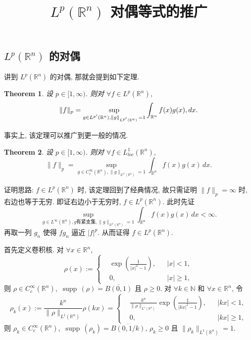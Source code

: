 \documentclass[a4paper,11pt]{article}
\title{$ L^p(\mathbb{R}^n) $ 对偶等式的推广}
\newtheorem{theorem}{Theorem}[section]
\theoremstyle{definition}
\def \supp {\mathop\mathrm{\,supp\,}}
\begin{document}
\begin{CJK*}{UTF8}{gbsn}

\maketitle

\section{$ L^p(\mathbb{R}^n) $ 的对偶}

讲到 $ L^p(\mathbb{R}^n) $ 的对偶, 那就会提到如下定理.

\begin{theorem}
    设 $ p \in [1, \infty) $. 则对 $ \forall f \in L^p(\mathbb{R}^n) $,
    $$
        \| f \|_p = \sup_{g \in L^{p'}(\mathbb{R}^n), \| g \|_{L^{p'}(\mathbb{R}^n)} \, = 1} 
            \int_{\mathbb{R}^n} f(x) g(x) \\, dx.
    $$
\end{theorem}

事实上, 该定理可以推广到更一般的情况.

\begin{theorem} \label{text}
    设 $ p \in [1, \infty) $. 则对 $ \forall f \in L^1_{loc}(\mathbb{R}^n) $,
    \begin{equation} \label{haha}
        \| f \|_p = \sup_{g \in C_c^\infty(\mathbb{R}^n), \| g \|_{L^{p'}(\mathbb{R}^n)} = 1} 
            \int_{\mathbb{R}^n} f(x) g(x) \, dx.
    \end{equation}
\end{theorem}

证明思路: $ f \in L^p(\mathbb{R}^n) $ 时, 该定理回到了经典情况, 
故只需证明 $ \| f \|_p = \infty $ 时, 右边也等于无穷. 
即证右边小于无穷时, $ f \in L^p(\mathbb{R}^n) $.
此时先证
$$
    \sup_{g \in L^\infty(\mathbb{R}^n), g \text{有紧支集}, \| g \|_{L^{p'}(\mathbb{R}^n)} = 1} 
        \int_{\mathbb{R}^n} f(x) g(x) \, dx < \infty.
$$
再取一列 $ g_n $ 使得 $ fg_n $ 逼近 $ |f|^p $. 从而证得 $ f \in L^p(\mathbb{R}^n) $.

首先定义卷积核. 对 $ \forall x \in \mathbb{R}^n $,
$$
    \rho(x) := \left\{ \begin{aligned}
        &\exp\left( \frac{1}{|x|^2 - 1} \right), && |x| < 1, \\
        &0,                             && |x| \geq 1,
    \end{aligned}\right.
$$
则 $ \rho \in C_c^\infty(\mathbb{R}^n) $, $ \supp(\rho) = \overline{B(0, 1)} $ 且 $ \rho \geq 0 $. 
对 $ \forall k \in \mathbb{N} $ 和 $ \forall x \in \mathbb{R}^n $, 令
$$
    \rho_k(x) := \frac{k^n}{\| \rho \|_{L^1(\mathbb{R}^n)}} \rho(kx)
        = \left\{ \begin{aligned}
        &\frac{k^n}{\| \rho \|_{L^1(\mathbb{R}^n)}} \exp\left( \frac{1}{|kx|^2 - 1} \right), && |kx| < 1, \\
        &0,                             && |kx| \geq 1,
    \end{aligned}\right.
$$
则 $ \rho_k \in C_c^\infty(\mathbb{R}^n) $, $ \supp(\rho_k) = \overline{B(0, 1/k)} $, $ \rho_k \geq 0 $
且 $ \| \rho_k \|_{L^1(\mathbb{R}^n)} = 1 $. 



\end{CJK*}
\end{document}
